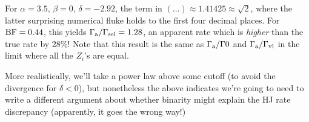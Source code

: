 \documentclass[12pt,modern]{aastex61}
\begin{document}
For $\alpha = 3.5$, $\beta=0$, $\delta=-2.92$, the term in $(\ldots)\approx 
1.41425 \approx \sqrt{2}$, where the latter surprising numerical fluke holds 
to the first four decimal places.
For ${\rm BF}=0.44$, this yields $\Gamma_{\rm a}/\Gamma_{\rm sel} = 1.28$, an 
apparent rate which is {\it higher} than the true rate by 28\%!
Note that this result is the same as $\Gamma_{\rm a}/\Gamma0$ and 
$\Gamma_{\rm a}/\Gamma_{\rm vl}$ in the limit where all the $Z_i$'s are equal.

More realistically, we'll take a power law above some cutoff (to avoid the 
divergence for $\delta<0$), but nonetheless the above indicates we're going to 
need to write a different argument about whether binarity might explain the HJ 
rate discrepancy (apparently, it goes the wrong way!)



\newpage
                            
 
\end{document}
